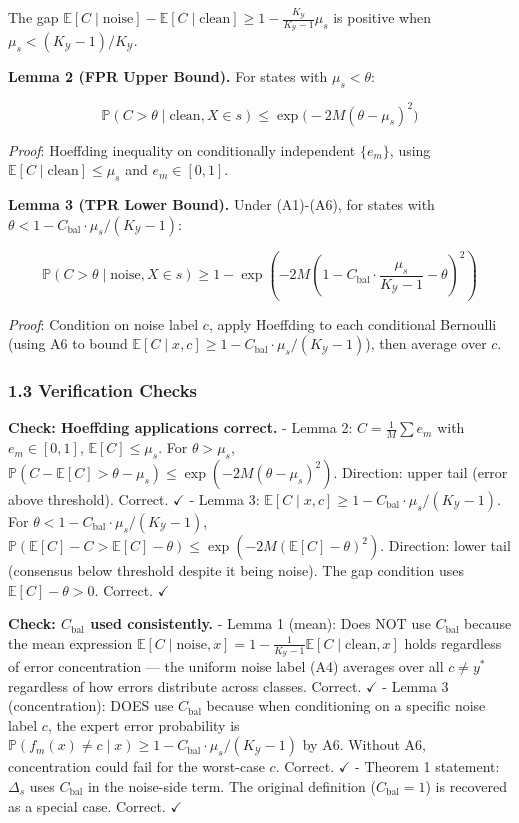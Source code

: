 \documentclass[
  12pt,
]{ctexart}
\begin{document}
The gap
\(\mathbb{E}[C \mid \text{noise}] - \mathbb{E}[C \mid \text{clean}] \geq 1 - \frac{K_{\mathcal{Y}}}{K_{\mathcal{Y}}-1}\mu_s\)
is positive when \(\mu_s < (K_{\mathcal{Y}}-1)/K_{\mathcal{Y}}\).

\textbf{Lemma 2 (FPR Upper Bound).} For states with \(\mu_s < \theta\):

\[\mathbb{P}(C > \theta \mid \text{clean}, X \in s) \leq \exp\!\bigl(-2M(\theta - \mu_s)^2\bigr)\]

\emph{Proof}: Hoeffding inequality on conditionally independent
\(\{e_m\}\), using \(\mathbb{E}[C \mid \text{clean}] \leq \mu_s\) and
\(e_m \in [0,1]\).

\textbf{Lemma 3 (TPR Lower Bound).} Under (A1)-(A6), for states with
\(\theta < 1 - C_{\text{bal}} \cdot \mu_s/(K_{\mathcal{Y}}-1)\):

\[\mathbb{P}(C > \theta \mid \text{noise}, X \in s) \geq 1 - \exp\!\left(-2M\!\left(1 - C_{\text{bal}} \cdot \frac{\mu_s}{K_{\mathcal{Y}}-1} - \theta\right)^2\right)\]

\emph{Proof}: Condition on noise label \(c\), apply Hoeffding to each
conditional Bernoulli (using A6 to bound
\(\mathbb{E}[C \mid x, c] \geq 1 - C_{\text{bal}}\cdot\mu_s/(K_{\mathcal{Y}}-1)\)),
then average over \(c\).

\subsubsection{1.3 Verification Checks}\label{verification-checks}

\textbf{Check: Hoeffding applications correct.} - Lemma 2:
\(C = \frac{1}{M}\sum e_m\) with \(e_m \in [0,1]\),
\(\mathbb{E}[C] \leq \mu_s\). For \(\theta > \mu_s\),
\(\mathbb{P}(C - \mathbb{E}[C] > \theta - \mu_s) \leq \exp(-2M(\theta-\mu_s)^2)\).
Direction: upper tail (error above threshold). Correct. \(\checkmark\) -
Lemma 3:
\(\mathbb{E}[C \mid x,c] \geq 1 - C_{\text{bal}}\cdot\mu_s/(K_{\mathcal{Y}}-1)\).
For \(\theta < 1 - C_{\text{bal}}\cdot\mu_s/(K_{\mathcal{Y}}-1)\),
\(\mathbb{P}(\mathbb{E}[C] - C > \mathbb{E}[C] - \theta) \leq \exp(-2M(\mathbb{E}[C]-\theta)^2)\).
Direction: lower tail (consensus below threshold despite it being
noise). The gap condition uses \(\mathbb{E}[C] - \theta > 0\). Correct.
\(\checkmark\)

\textbf{Check: \(C_{\text{bal}}\) used consistently.} - Lemma 1 (mean):
Does NOT use \(C_{\text{bal}}\) because the mean expression
\(\mathbb{E}[C \mid \text{noise}, x] = 1 - \frac{1}{K_{\mathcal{Y}}-1} \mathbb{E}[C \mid \text{clean}, x]\)
holds regardless of error concentration --- the uniform noise label (A4)
averages over all \(c \neq y^*\) regardless of how errors distribute
across classes. Correct. \(\checkmark\) - Lemma 3 (concentration): DOES
use \(C_{\text{bal}}\) because when conditioning on a specific noise
label \(c\), the expert error probability is
\(\mathbb{P}(f_m(x) \neq c \mid x) \geq 1 - C_{\text{bal}}\cdot\mu_s/(K_{\mathcal{Y}}-1)\)
by A6. Without A6, concentration could fail for the worst-case \(c\).
Correct. \(\checkmark\) - Theorem 1 statement: \(\Delta_s\) uses
\(C_{\text{bal}}\) in the noise-side term. The original definition
(\(C_{\text{bal}}=1\)) is recovered as a special case. Correct.
\(\checkmark\)
\end{document}
